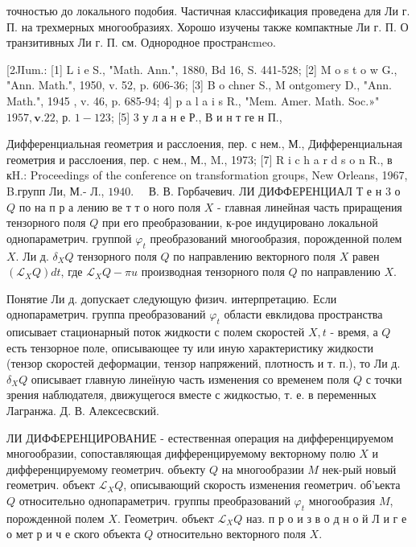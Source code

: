 \documentclass[10pt]{article}
\begin{document}
точностью до локального подобия. Частичная классификация проведена для Ли г. П. на трехмерных многообразиях. Хорошо изучены также компактные Ли г. П. О транзитивных Ли г. П. см. Однородное пространcmeo.



[2JIum.: [1] L i e S., "Math. Ann.", 1880, Bd 16, S. 441-528; [2] M o s t o w G., "Ann. Math.", 1950, v. 52, p. 606-36; [3] B o chner S., M ontgomery D., "Ann. Math.", 1945 , v. 46, p. 685-94; 4] p a l a i s R., "Mem. Amer. Math. Soc.»" $1957, \mathbf{v} .22$, р. $1-123$; [5] 3 у л а н е Р., В и н т ге н П.,

Дифференциальная геометрия и расслоения, пер. с нем., М., Дифференциальная геометрия и расслоения, пер. с нем., М., M., 1973; [7] R i c h a r d s o $\mathrm{n}$ R., в кH.: Proceedings of the conference on transformation groups, New Orleans, 1967, B.групп Ли, М.- Л., $1940 . \quad$ В. В. Горбачевич. ЛИ ДИФФЕРЕНЦИАЛ Т е н 3 о $Q$ по на п р а лению ве т т о ного поля $X$ - главная линейная часть приращения тензорного поля $Q$ при его преобразовании, к-рое индуцировано локальной однопараметрич. группой $\varphi_{t}$ преобразований многообразия, порожденной полем $X$. Ли д. $\delta_{X} Q$ тензорного поля $Q$ по направлению векторного поля $X$ равен $\left(\mathscr{L}_{X} Q\right) d t$, где $\mathscr{L}_{X} Q-\pi u$ производная тензорного поля $Q$ по направлению $X$.



Понятие Ли д. допускает следующую физич. интерпретацию. Если однопараметрич. группа преобразований $\varphi_{t}$ области евклидова пространства описывает стационарный поток жидкости с полем скоростей $X, t$ - время, а $Q$ есть тензорное поле, описывающее ту или иную характеристику жидкости (тензор скоростей деформации, тензор напряжений, плотность и т. п.), то Ли д. $\delta_{X} Q$ описывает главную линеїную часть изменения со временем поля $Q$ с точки зрения наблюдателя, движущегося вместе с жидкостью, т. е. в переменных Лагранжа. Д. В. Алексесвский.



ЛИ ДИФФЕРЕНЦИРОВАНИЕ - естественная операция на дифференцируемом многообразии, сопоставляющая дифференцируемому векторному полю $X$ и дифференцируемому геометрич. объекту $Q$ на многообразии $M$ нек-рый новый геометрич. объект $\mathscr{L}_{X} Q$, описывающий скорость изменения геометрич. об'ьекта $Q$ относительно однопараметрич. группы преобразований $\varphi_{t}$ многообразия $M$, порожденной полем $X$. Геометрич. объект $\mathscr{L}_{X} Q$ наз. п р о и з в о д н о й Л и г е о мет р и ч е ского объекта $Q$ относительно векторного поля $X$.
\end{document}
